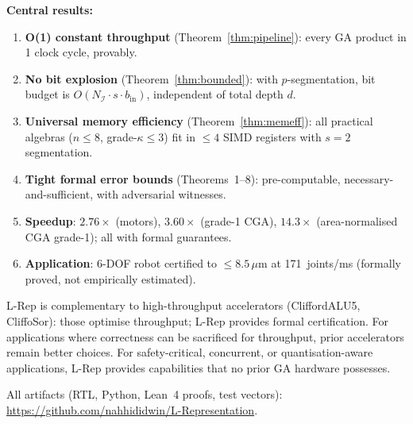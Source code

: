 \documentclass[11pt,a4paper]{article}
\theoremstyle{definition}
\theoremstyle{plain}
\theoremstyle{remark}
\begin{document}
\textbf{Central results:}
\begin{enumerate}
  \item \textbf{O(1) constant throughput} (Theorem~\ref{thm:pipeline}):
        every GA product in 1 clock cycle, provably.
  \item \textbf{No bit explosion} (Theorem~\ref{thm:bounded}):
        with $p$-segmentation, bit budget is $O(N_\mathcal{I}\cdot s\cdot b_\mathrm{in})$,
        independent of total depth $d$.
  \item \textbf{Universal memory efficiency} (Theorem~\ref{thm:memeff}):
        all practical algebras ($n\le 8$, grade-$\kappa\le 3$) fit in $\le 4$
        SIMD registers with $s=2$ segmentation.
  \item \textbf{Tight formal error bounds} (Theorems~1--8):
        pre-computable, necessary-and-sufficient, with adversarial witnesses.
  \item \textbf{Speedup}: $2.76\times$ (motors), $3.60\times$ (grade-1 CGA),
        $14.3\times$ (area-normalised CGA grade-1); all with formal guarantees.
  \item \textbf{Application}: 6-DOF robot certified to $\le 8.5\,\mu\mathrm{m}$
        at 171~joints/ms (formally proved, not empirically estimated).
\end{enumerate}

L-Rep is complementary to high-throughput accelerators (CliffordALU5,
CliffoSor): those optimise throughput; L-Rep provides formal certification.
For applications where correctness can be sacrificed for throughput,
prior accelerators remain better choices.
For safety-critical, concurrent, or quantisation-aware applications,
L-Rep provides capabilities that no prior GA hardware possesses.

All artifacts (RTL, Python, Lean~4 proofs, test vectors):
\url{https://github.com/nahhididwin/L-Representation}.

\appendix
\end{document}
